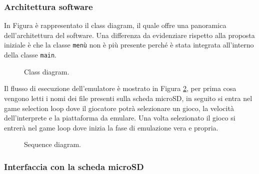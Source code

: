 \documentclass[a4paper]{article}
\begin{document}
\subsubsection{Architettura software}

In Figura \label{fig:class_diagram} è rappresentato il class diagram, il quale offre una panoramica
dell'architettura del software. Una differenza da evidenziare rispetto alla proposta iniziale
è che la classe \texttt{menù} non è più presente perché è stata integrata all'interno della
classe \texttt{main}.

\begin{figure}[h!t]
    \begin{center}
        \begin{tikzpicture}[scale=0.6, transform shape]
            
        \end{tikzpicture}
    \end{center}
    \caption{
       Class diagram.
    }
    \label{fig:class_diagram}
\end{figure}

Il flusso di esecuzione dell'emulatore è mostrato in Figura \ref{fig:sequence_diagram},
per prima cosa vengono letti i nomi dei file presenti sulla scheda microSD, in seguito
si entra nel game selection loop dove il giocatore potrà selezionare un gioco, la velocità
dell'interprete e la piattaforma da emulare. Una volta selezionato il gioco si entrerà nel
game loop dove inizia la fase di emulazione vera e propria.

\begin{figure}[h!t]
    \begin{center}
        
    \end{center}
    \caption{
        Sequence diagram.
    }
    \label{fig:sequence_diagram}
\end{figure}

\subsubsection{Interfaccia con la scheda microSD}\label{subsubsec:sd}

%
%
\end{document}
